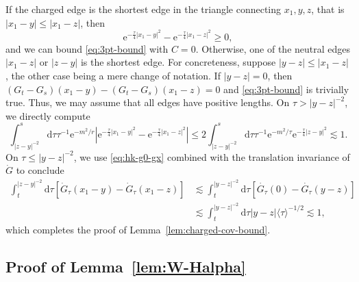 \documentclass[11pt, a4paper]{scrartcl}
\numberwithin{equation}{section}
\theoremstyle{plain}
\theoremstyle{remark}
\newcommand{\mathd}{\mathrm{d}}
\newcommand{\mathe}{\mathrm{e}}
\begin{document}
If the charged edge is the shortest edge in the triangle connecting $x_1, y,
z$, that is $| x_1 - y | \leqslant | x_1 - z |$, then
\[ \mathe^{- \frac{\tau}{4} | x_1 - y |^2} - \mathe^{- \frac{\tau}{4} | x_1 -
   z |^2} \geqslant 0, \]
and we can bound \eqref{eq:3pt-bound} with $C = 0$. Otherwise, one of the
neutral edges $| x_1 - z |$ or $| z - y |$ is the shortest edge. For
concreteness, suppose $| y - z | \leqslant | x_1 - z |$, the other case being
a mere change of notation. If $| y - z | = 0$, then$(G_t - G_s) (x_1 - y) -
(G_t - G_s) (x_1 - z) = 0$ and \eqref{eq:3pt-bound} is trivially true. Thus,
we may assume that all edges have positive lengths. On $\tau > | y - z |^{-
2}$, we directly compute
\[ \int^s_{| z - y |^{- 2}} \mathd \tau \tau^{- 1} \mathe^{- m^2 / r} \left|
   \mathe^{- \frac{\tau}{4} | x_1 - y |^2} - \mathe^{- \frac{\tau}{4} | x_1 -
   z |^2} \right| \leqslant 2 \int^s_{| z - y |^{- 2}} \mathd \tau \tau^{- 1}
   \mathe^{- m^2 / \tau} \mathe^{- \frac{\tau}{4} | z - y |^2} \lesssim 1. \]
On $\tau \leqslant | y - z |^{- 2}$, we use \eqref{eq:hk-g0-gx} combined with
the translation invariance of $\dot{G}$ to conclude
\begin{align*}
  \int_t^{| z - y |^{- 2}} \mathd \tau [\dot{G}_{\tau} (x_1 - y) -
   \dot{G}_{\tau} (x_1 - z)]
   &\lesssim \int_t^{| y - z |^{- 2}} \mathd \tau
   [\dot{G_{\tau}} (0) - \dot{G_{\tau}} (y - z)] \\
   &\lesssim \int_t^{| y - z |^{-
   2}} \mathd \tau | y - z | \langle \tau \rangle^{- 1 / 2} \lesssim 1,
\end{align*}
which completes the proof of Lemma~\ref{lem:charged-cov-bound}.

\subsection{Proof of Lemma~\ref{lem:W-Halpha}}
\end{document}
